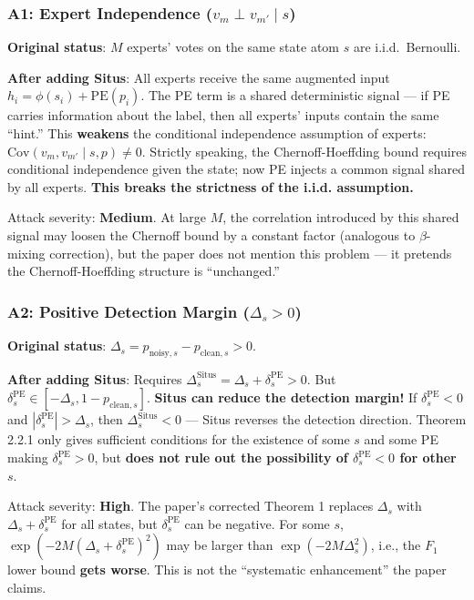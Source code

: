 \documentclass[
  12pt,
]{article}
\begin{document}
\subsubsection{A1: Expert Independence ($v_m \perp v_{m'} \mid s$)}\label{a1-expert-independence}

\textbf{Original status}: $M$ experts' votes on the same state atom $s$ are i.i.d.\ Bernoulli.

\textbf{After adding Situs}: All experts receive the same augmented input $h_i = \phi(s_i) + \text{PE}(p_i)$. The PE term is a shared deterministic signal --- if PE carries information about the label, then all experts' inputs contain the same ``hint.'' This \textbf{weakens} the conditional independence assumption of experts: $\text{Cov}(v_m, v_{m'} \mid s, p) \neq 0$. Strictly speaking, the Chernoff-Hoeffding bound requires conditional independence given the state; now PE injects a common signal shared by all experts. \textbf{This breaks the strictness of the i.i.d. assumption.}

Attack severity: \textbf{Medium}. At large $M$, the correlation introduced by this shared signal may loosen the Chernoff bound by a constant factor (analogous to $\beta$-mixing correction), but the paper does not mention this problem --- it pretends the Chernoff-Hoeffding structure is ``unchanged.''

\subsubsection{A2: Positive Detection Margin ($\Delta_s > 0$)}\label{a2-positive-detection-margin}

\textbf{Original status}: $\Delta_s = p_{\text{noisy},s} - p_{\text{clean},s} > 0$.

\textbf{After adding Situs}: Requires $\Delta_s^{\text{Situs}} = \Delta_s + \delta_s^{\text{PE}} > 0$. But $\delta_s^{\text{PE}} \in [-\Delta_s, 1-p_{\text{clean},s}]$. \textbf{Situs can reduce the detection margin!} If $\delta_s^{\text{PE}} < 0$ and $|\delta_s^{\text{PE}}| > \Delta_s$, then $\Delta_s^{\text{Situs}} < 0$ --- Situs reverses the detection direction. Theorem 2.2.1 only gives sufficient conditions for the existence of some $s$ and some PE making $\delta_s^{\text{PE}} > 0$, but \textbf{does not rule out the possibility of $\delta_s^{\text{PE}} < 0$ for other $s$}.

Attack severity: \textbf{High}. The paper's corrected Theorem 1 replaces $\Delta_s$ with $\Delta_s + \delta_s^{\text{PE}}$ for all states, but $\delta_s^{\text{PE}}$ can be negative. For some $s$, $\exp(-2M(\Delta_s + \delta_s^{\text{PE}})^2)$ may be larger than $\exp(-2M\Delta_s^2)$, i.e., the $F_1$ lower bound \textbf{gets worse}. This is not the ``systematic enhancement'' the paper claims.
\end{document}
